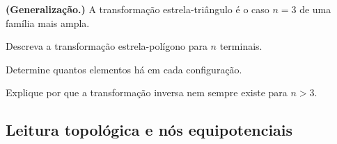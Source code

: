 \begin{questao}[4]{}

\textbf{(Generalização.)} A transformação estrela-triângulo é o caso $n=3$ de
uma família mais ampla.
\begin{itensq}
\item Descreva a transformação estrela-polígono para $n$ terminais.
\item Determine quantos elementos há em cada configuração.
\item Explique por que a transformação inversa nem sempre existe para $n>3$.
\end{itensq}


\end{questao}


\subsection{Leitura topológica e nós equipotenciais}

